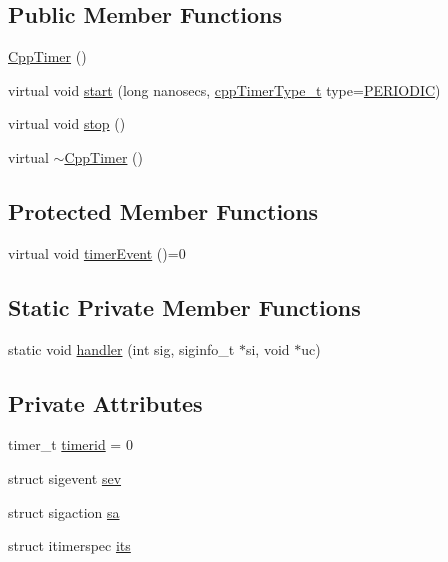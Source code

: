 \subsection*{Public Member Functions}
\begin{DoxyCompactItemize}
\item 
\hyperlink{classCppTimer_a327a07c051b9b60fcc61e6fd8f40f381}{Cpp\+Timer} ()
\item 
virtual void \hyperlink{classCppTimer_a64989025caa3c030c6c397ca76a2d20b}{start} (long nanosecs, \hyperlink{CppTimer_8h_a110d07ab6a96d7815149d3d95435790a}{cpp\+Timer\+Type\+\_\+t} type=\hyperlink{CppTimer_8h_a110d07ab6a96d7815149d3d95435790aae4379d044711537d9ce3b3b58c575c58}{P\+E\+R\+I\+O\+D\+IC})
\item 
virtual void \hyperlink{classCppTimer_a4bb95ddee98a536d0818b8f6096bf7e7}{stop} ()
\item 
virtual \hyperlink{classCppTimer_a91779a93fce7383a8d832ed481399342}{$\sim$\+Cpp\+Timer} ()
\end{DoxyCompactItemize}
\subsection*{Protected Member Functions}
\begin{DoxyCompactItemize}
\item 
virtual void \hyperlink{classCppTimer_ac2665403595b6aee5f581d0ebfeb886c}{timer\+Event} ()=0
\end{DoxyCompactItemize}
\subsection*{Static Private Member Functions}
\begin{DoxyCompactItemize}
\item 
static void \hyperlink{classCppTimer_a7cf621a640ea9a1e567ee295c7255b5d}{handler} (int sig, siginfo\+\_\+t $\ast$si, void $\ast$uc)
\end{DoxyCompactItemize}
\subsection*{Private Attributes}
\begin{DoxyCompactItemize}
\item 
timer\+\_\+t \hyperlink{classCppTimer_a90ff764263fdde5a0f6e53429c8cf734}{timerid} = 0
\item 
struct sigevent \hyperlink{classCppTimer_a9860d3d723ad55982db50c9cde8d725a}{sev}
\item 
struct sigaction \hyperlink{classCppTimer_a692a200df6d2c43b72ff1db76458f09f}{sa}
\item 
struct itimerspec \hyperlink{classCppTimer_a8774fb5ba9af8f276874c1234741f106}{its}
\end{DoxyCompactItemize}


